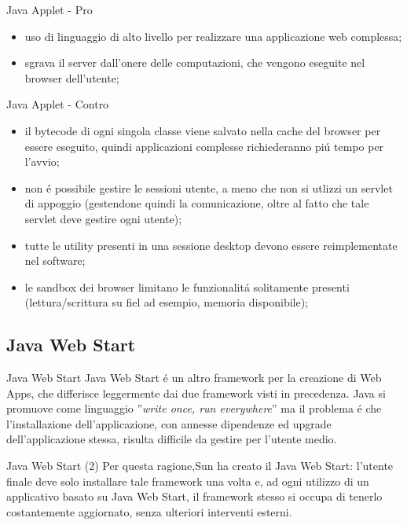 \documentclass{beamer}
\begin{document}
\begin{frame}{Java Applet - Pro}
\begin{itemize}
\item uso di linguaggio di alto livello per realizzare una applicazione web complessa;
\item sgrava il server dall'onere delle computazioni, che vengono eseguite nel browser dell'utente;
\end{itemize}
\end{frame}

\begin{frame}{Java Applet - Contro}
\begin{itemize}
\item il bytecode di ogni singola classe viene salvato nella cache del browser per essere eseguito, quindi applicazioni complesse
richiederanno pi\'u tempo per l'avvio;
\item non \'e possibile gestire le sessioni utente, a meno che non si utlizzi un servlet di appoggio (gestendone quindi la
comunicazione, oltre al fatto che tale servlet deve gestire ogni utente);
\item tutte le utility presenti in una sessione desktop devono essere reimplementate nel software;
\item le sandbox dei browser limitano le funzionalit\'a solitamente presenti (lettura/scrittura su fiel ad esempio, memoria 
disponibile);
\end{itemize}
\end{frame}

\subsection{Java Web Start}
\begin{frame}{Java Web Start}
Java Web Start \'e un altro framework per la creazione di Web Apps, che differisce leggermente dai due framework visti in
precedenza. Java si promuove come linguaggio ''\emph{write once, run everywhere}'' ma il problema \'e che l'installazione 
dell'applicazione, con annesse dipendenze ed upgrade dell'applicazione stessa, risulta difficile da gestire per l'utente medio.
\end{frame}

\begin{frame}{Java Web Start (2)}
Per questa ragione,Sun ha creato il Java Web Start: l'utente finale deve solo installare tale framework una volta e, ad ogni
utilizzo di un applicativo basato su Java Web Start, il framework stesso si occupa di tenerlo costantemente aggiornato, senza
 ulteriori interventi esterni.
\end{frame}
\end{document}

